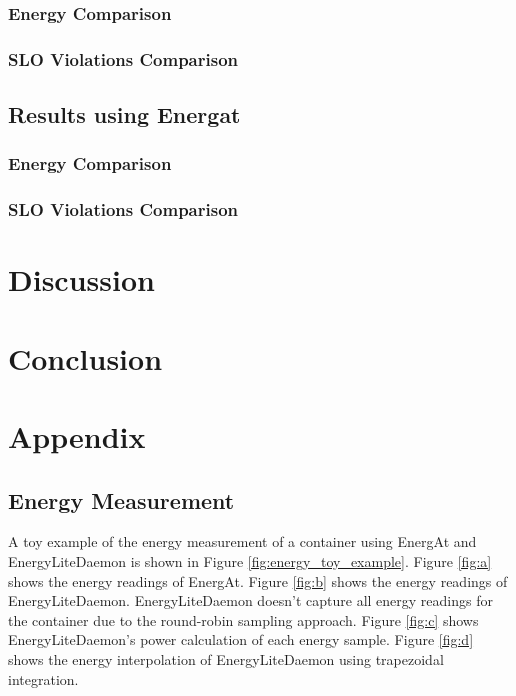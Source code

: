 \documentclass[times, 10pt,twocolumn]{article}
\begin{document}
\subsubsection{Energy Comparison}

\subsubsection{SLO Violations Comparison}

\subsection{Results using Energat}

\subsubsection{Energy Comparison}

\subsubsection{SLO Violations Comparison}


\section{Discussion}

\section{Conclusion}





\appendix
\section{Appendix}
\subsection{Energy Measurement}
\label{appendix:energy_measurement}
A toy example of the energy measurement of a container using EnergAt and EnergyLiteDaemon is shown in Figure \ref{fig:energy_toy_example}. Figure \ref{fig:a} shows the energy readings of EnergAt. Figure \ref{fig:b} shows the energy readings of EnergyLiteDaemon. EnergyLiteDaemon doesn't capture all energy readings for the container due to the round-robin sampling approach. Figure \ref{fig:c} shows EnergyLiteDaemon's power calculation of each energy sample. Figure \ref{fig:d} shows the energy interpolation of EnergyLiteDaemon using trapezoidal integration.
\end{document}
